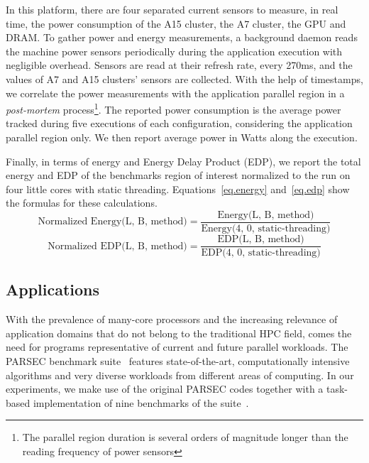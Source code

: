 In this platform, there are four separated current sensors to measure, in real time, the power consumption of the A15 cluster, the A7 cluster, the GPU and DRAM. 
To gather power and energy measurements, a background daemon reads the machine power 
sensors periodically during the application execution with negligible overhead. Sensors are read 
at their refresh rate, every 270ms, and the values of A7 and A15 clusters' sensors are collected.
With the help of timestamps, we 
correlate the power measurements with the application parallel region in a  
\emph{post-mortem} process\footnote{The parallel region duration is several orders of magnitude longer than the reading frequency of power sensors}. 
The reported power consumption is the average power tracked during five executions of each configuration, considering the application parallel region only. 
We then report average power in Watts along the execution. 

Finally, in terms of energy and Energy Delay Product (EDP), we report the total energy and EDP of 
the benchmarks region of interest normalized to the run on four 
little cores with static threading.
Equations~\ref{eq.energy} and~\ref{eq.edp} show the formulas for these calculations.
\begingroup\makeatletter\def\f@size{8}\check@mathfonts
\begin{equation}
  \text{Normalized Energy(L, B, method)} = \frac{\text{Energy(L, B, method)}}{\text{Energy(4, 0, static-threading)}}
  \label{eq.energy}
\end{equation}
\begin{equation}
  \text{Normalized EDP(L, B, method)} = \frac{\text{EDP(L, B, method)}}{\text{EDP(4, 0, static-threading)}}
  \label{eq.edp}
\end{equation}
\endgroup




\subsection{Applications}
\label{sec:parsec}

With the prevalence of many-core processors and the increasing relevance of application 
domains that do not belong to the traditional HPC field, comes the need for programs 
representative of current and future parallel workloads. 
The PARSEC benchmark suite~\cite{PARSEC3,Bienia:PhD2011} features state-of-the-art, 
computationally intensive algorithms and very diverse workloads from different areas of computing.
In our experiments, we make use of the original PARSEC codes together with a task-based 
implementation of nine benchmarks of the suite~\cite{Chasapis:TACO2016}. 

